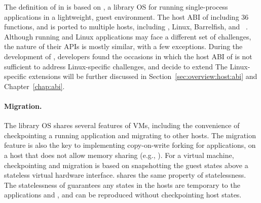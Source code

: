 The definition of \thehostabi{} in \graphene{} is based on
\drawbridge{},
a library OS for running single-process \win{} applications
in a lightweight, guest environment.
The host ABI of \drawbridge{} 
including 36 functions,
and is ported to multiple hosts,
including \win{}, Linux, Barrelfish, and \sgx{}~\cite{porter11drawbridge,baumann14haven,mssql-on-linux,baumann13bascule}.
Although running \win{} and Linux applications may face
a different set of challenges,
the nature of their APIs is mostly similar, with a few exceptions.
During the development of \graphene{}, developers found the occasions in which
the host ABI of \drawbridge{}
is not sufficient to address Linux-specific challenges,
and decide to extend \thehostabi{}
The Linux-specific extensions will be further discussed in Section~\ref{sec:overview:host:abi} and Chapter~\ref{chap:abi}.


\paragraph{Migration.}
The \graphene{} library OS shares several features of VMs, including the convenience of checkpointing a running application and migrating to other hosts.
The migration feature is also the key to implementing copy-on-write forking for applications,
on a host that does not allow memory sharing (e.g., \sgx{}).
For a virtual machine, checkpointing and migration is based on snapshotting the guest states above a stateless virtual hardware interface. %
\Thehostabi{} shares the same property of statelessness.
The statelessness of \thehostabi{} guarantees any states in the hosts are temporary to the applications and \libos{}, and can be reproduced without checkpointing host states.





